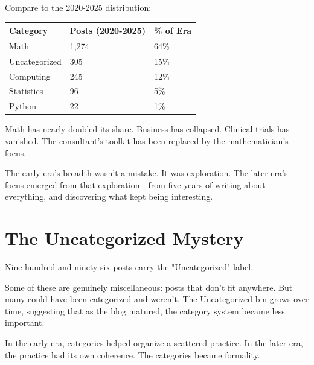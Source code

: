 Compare to the 2020-2025 distribution:

\begin{longtable}{p{3.00cm}p{3.00cm}p{3.00cm}}
\toprule
\textbf{Category} & \textbf{Posts (2020-2025)} & \textbf{\% of Era} \tabularnewline
\midrule
Math & 1,274 & 64\% \tabularnewline
Uncategorized & 305 & 15\% \tabularnewline
Computing & 245 & 12\% \tabularnewline
Statistics & 96 & 5\% \tabularnewline
Python & 22 & 1\% \tabularnewline
\bottomrule
\end{longtable}

Math has nearly doubled its share. Business has collapsed. Clinical trials has vanished. The consultant's toolkit has been replaced by the mathematician's focus.

The early era's breadth wasn't a mistake. It was exploration. The later era's focus emerged from that exploration---from five years of writing about everything, and discovering what kept being interesting.

\bigskip

\section*{The Uncategorized Mystery}

Nine hundred and ninety-six posts carry the "Uncategorized" label.

Some of these are genuinely miscellaneous: posts that don't fit anywhere. But many could have been categorized and weren't. The Uncategorized bin grows over time, suggesting that as the blog matured, the category system became less important.

In the early era, categories helped organize a scattered practice. In the later era, the practice had its own coherence. The categories became formality.

